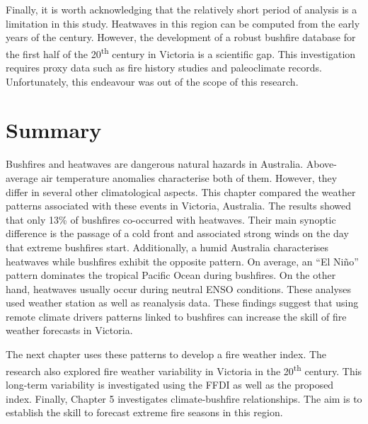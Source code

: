 Finally, it is worth acknowledging that the relatively short period
of analysis is a limitation in this study. Heatwaves in this region
can be computed from the early years of the century. However, the
development of a robust bushfire database for the first half of the
20\textsuperscript{th} century in Victoria is a scientific gap. This
investigation requires proxy data such as fire history studies and
paleoclimate records. Unfortunately, this endeavour was out of the
scope of this research.


\section{Summary}

Bushfires and heatwaves are dangerous natural hazards in Australia.
Above-average air temperature anomalies characterise both of them.
However, they differ in several other climatological aspects. This
chapter compared the weather patterns associated with these events
in Victoria, Australia. The results showed that only 13\% of bushfires
co-occurred with heatwaves. Their main synoptic difference is 
the passage of a cold front and associated strong winds on the day that extreme bushfires start.  
Additionally, a humid Australia characterises
heatwaves while bushfires exhibit the opposite pattern. On average,
an ``El Ni\~no'' pattern dominates the tropical Pacific Ocean during
bushfires. On the other hand, heatwaves usually occur during neutral
ENSO conditions. These analyses used weather station as well as reanalysis
data. These findings suggest that using remote climate drivers patterns
linked to bushfires can increase the skill of fire weather forecasts
in Victoria.

The next chapter uses these patterns to develop a fire weather index.
The research also explored fire weather variability in Victoria in
the 20\textsuperscript{th} century. This long-term variability is
investigated using the FFDI as well as the proposed index. Finally,
Chapter 5 investigates climate-bushfire relationships. The aim is
to establish the skill to forecast extreme fire seasons in this region.

